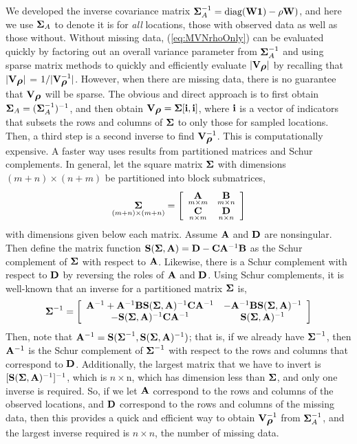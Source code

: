 \documentclass[11pt, titlepage]{article}\usepackage[]{graphicx}\usepackage[]{color}
\begin{document}
We developed the inverse covariance matrix $\mbox{\boldmath $\Sigma$}_A^{-1} = \textrm{diag}(\mathbf{W}\mathbf{1}) - \rho\mathbf{W})$, and here we use $\mbox{\boldmath $\Sigma$}_A$ to denote it is for \emph{all} locations, those with observed data as well as those without. Without missing data, (\ref{eq:MVNrhoOnly}) can be evaluated quickly by factoring out an overall variance parameter from $\mbox{\boldmath $\Sigma$}_A^{-1}$ and using sparse matrix methods to quickly and efficiently evaluate $|\mathbf{V}_{\mbox{\boldmath $\rho$}}|$ by recalling that $|\mathbf{V}_{\mbox{\boldmath $\rho$}}|$ = $1/|\mathbf{V}^{-1}_{\mbox{\boldmath $\rho$}}|$.  However, when there are missing data, there is no guarantee that $\mathbf{V}_{\mbox{\boldmath $\rho$}}$ will be sparse.  The obvious and direct approach is to first obtain $\mbox{\boldmath $\Sigma$}_A = (\mbox{\boldmath $\Sigma$}_A^{-1})^{-1}$, and then obtain $\mathbf{V}_{\mbox{\boldmath $\rho$}} = \mbox{\boldmath $\Sigma$}[\mathbf{i},\mathbf{i}]$, where $\mathbf{i}$ is a vector of indicators that subsets the rows and columns of $\mbox{\boldmath $\Sigma$}$ to only those for sampled locations.  Then, a third step is a second inverse to find $\mathbf{V}_{\mbox{\boldmath $\rho$}}^{-1}$.  This is computationally expensive.  A faster way uses results from partitioned matrices and Schur complements.  In general, let the square matrix $\mbox{\boldmath $\Sigma$}$ with dimensions $(m + n) \times (n + m)$ be partitioned into block submatrices,
\[
  \underset{(m+n) \times (m+n)}{\mbox{\boldmath $\Sigma$}} = \left[
    \begin{array}{cc}
	    \underset{m \times m}{\mathbf{A}} & \underset{m \times n}{\mathbf{B}} \\
	    \underset{n \times m}{\mathbf{C}} & \underset{n \times n}{\mathbf{D}}
    \end{array}
  \right]
\]
with dimensions given below each matrix. Assume $\mathbf{A}$ and $\mathbf{D}$ are nonsingular.  Then define the matrix function $\mathbf{S}(\mbox{\boldmath $\Sigma$},\mathbf{A}) = \mathbf{D} - \mathbf{C}\mathbf{A}^{-1}\mathbf{B}$ as the Schur complement of $\mbox{\boldmath $\Sigma$}$ with respect to $\mathbf{A}$.  Likewise, there is a Schur complement with respect to $\mathbf{D}$ by reversing the roles of $\mathbf{A}$ and $\mathbf{D}$.  Using Schur complements, it is well-known \citep[e.g,][p. 97]{Harv:matr:1997} that an inverse for a partitioned matrix $\mbox{\boldmath $\Sigma$}$ is,
\[
  \mbox{\boldmath $\Sigma$}^{-1} = \left[
    \begin{array}{cc}
      \mathbf{A}^{-1} + \mathbf{A}^{-1}\mathbf{B}\mathbf{S}(\mbox{\boldmath $\Sigma$},\mathbf{A})^{-1}\mathbf{C}\mathbf{A}^{-1} & -\mathbf{A}^{-1}\mathbf{B}\mathbf{S}(\mbox{\boldmath $\Sigma$},\mathbf{A})^{-1} \\
      -\mathbf{S}(\mbox{\boldmath $\Sigma$},\mathbf{A})^{-1}\mathbf{C}\mathbf{A}^{-1} & \mathbf{S}(\mbox{\boldmath $\Sigma$},\mathbf{A})^{-1}
    \end{array}
  \right]
\]
Then, note that $\mathbf{A}^{-1} = \mathbf{S}(\mbox{\boldmath $\Sigma$}^{-1}, \mathbf{S}(\mbox{\boldmath $\Sigma$},\mathbf{A})^{-1})$; that is, if we already have $\mbox{\boldmath $\Sigma$}^{-1}$, then $\mathbf{A}^{-1}$ is the Schur complement of $\mbox{\boldmath $\Sigma$}^{-1}$ with respect to the rows and columns that correspond to $\mathbf{D}$.  Additionally, the largest matrix that we have to invert is $[\mathbf{S}(\mbox{\boldmath $\Sigma$},\mathbf{A})^{-1}]^{-1}$, which is $n \times $n, which has dimension less than $\mbox{\boldmath $\Sigma$}$, and only one inverse is required. So, if we let $\mathbf{A}$ correspond to the rows and columns of the observed locations, and $\mathbf{D}$ correspond to the rows and columns of the missing data, then this provides a quick and efficient way to obtain $\mathbf{V}_{\mbox{\boldmath $\rho$}}^{-1}$ from $\mbox{\boldmath $\Sigma$}_A^{-1}$, and the largest inverse required is $n \times n$, the number of missing data.
\end{document}
